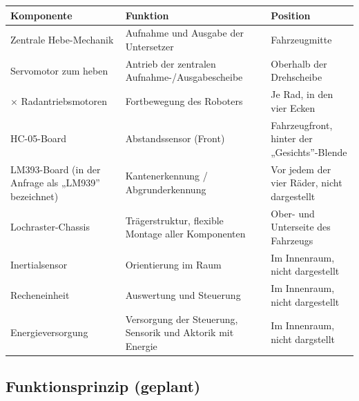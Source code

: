\documentclass[
  a4paper,
  12pt,
  DIV=12,        %
  parskip=half,  %
  headings=small %
]{scrartcl}
\theoremstyle{definition}
\theoremstyle{definition}
\begin{document}
{\def\LTcaptype{none} %
\begin{longtable}[]{@{}
  >{\raggedright\arraybackslash}p{}
  >{\raggedright\arraybackslash}p{}
  >{\raggedright\arraybackslash}p{}@{}}
\toprule\noalign{}
\begin{minipage}[b]{\linewidth}\raggedright
Komponente
\end{minipage} & \begin{minipage}[b]{\linewidth}\raggedright
Funktion
\end{minipage} & \begin{minipage}[b]{\linewidth}\raggedright
Position
\end{minipage} \\
\midrule\noalign{}
\endhead
\bottomrule\noalign{}
\endlastfoot
Zentrale Hebe-Mechanik & Aufnahme und Ausgabe der Untersetzer &
Fahrzeugmitte \\
Servomotor zum heben & Antrieb der zentralen Aufnahme-/Ausgabescheibe &
Oberhalb der Drehscheibe \\
4× Radantriebsmotoren & Fortbewegung des Roboters & Je Rad, in den vier
Ecken \\
HC-05-Board & Abstandssensor (Front) & Fahrzeugfront, hinter der
„Gesichts''-Blende \\
LM393-Board (in der Anfrage als „LM939'' bezeichnet) & Kantenerkennung /
Abgrunderkennung & Vor jedem der vier Räder, nicht dargestellt \\
Lochraster-Chassis & Trägerstruktur, flexible Montage aller Komponenten
& Ober- und Unterseite des Fahrzeugs \\
Inertialsensor & Orientierung im Raum & Im Innenraum, nicht
dargestellt \\
Recheneinheit & Auswertung und Steuerung & Im Innenraum, nicht
dargestellt \\
Energieversorgung & Versorgung der Steuerung, Sensorik und Aktorik mit
Energie & Im Innenraum, nicht dargstellt \\
\end{longtable}
}

\subsection{Funktionsprinzip
(geplant)}\label{funktionsprinzip-geplant}
\end{document}
